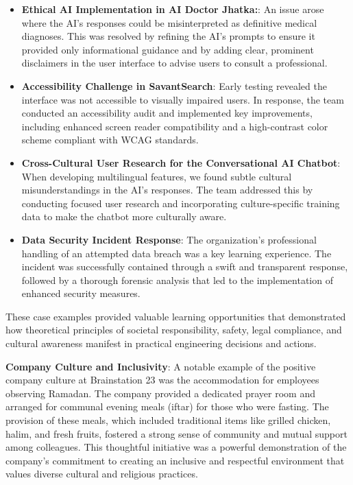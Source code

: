 \documentclass[12pt,a4paper]{article}
\begin{document}
\begin{itemize}
    \item \textbf{Ethical AI Implementation in AI Doctor Jhatka:}:  An issue arose where the AI's responses could be misinterpreted as definitive medical diagnoses. This was resolved by refining the AI's prompts to ensure it provided only informational guidance and by adding clear, prominent disclaimers in the user interface to advise users to consult a professional.
    
    \item \textbf{Accessibility Challenge in SavantSearch}: Early testing revealed the interface was not accessible to visually impaired users. In response, the team conducted an accessibility audit and implemented key improvements, including enhanced screen reader compatibility and a high-contrast color scheme compliant with WCAG standards.
    
    \item \textbf{Cross-Cultural User Research for the Conversational AI Chatbot}: When developing multilingual features, we found subtle cultural misunderstandings in the AI's responses. The team addressed this by conducting focused user research and incorporating culture-specific training data to make the chatbot more culturally aware.
    \item \textbf{Data Security Incident Response}: The organization's professional handling of an attempted data breach was a key learning experience. The incident was successfully contained through a swift and transparent response, followed by a thorough forensic analysis that led to the implementation of enhanced security measures.
\end{itemize}

These case examples provided valuable learning opportunities that demonstrated how theoretical principles of societal responsibility, safety, legal compliance, and cultural awareness manifest in practical engineering decisions and actions.

\textbf{Company Culture and Inclusivity}: A notable example of the positive company culture at Brainstation 23 was the accommodation for employees observing Ramadan. The company provided a dedicated prayer room and arranged for communal evening meals (iftar) for those who were fasting. The provision of these meals, which included traditional items like grilled chicken, halim, and fresh fruits, fostered a strong sense of community and mutual support among colleagues. This thoughtful initiative was a powerful demonstration of the company’s commitment to creating an inclusive and respectful environment that values diverse cultural and religious practices.
\end{document}
